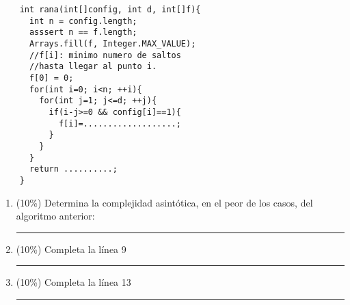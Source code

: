 \documentclass[9.5 pt]{article}
\begin{document}
\begin{multicols}{2}
\begin{itemize}[noitemsep]
	\end{itemize}
	\begin{lstlisting}
	int rana(int[]config, int d, int[]f){
	  int n = config.length;
	  asssert n == f.length;
	  Arrays.fill(f, Integer.MAX_VALUE);
	  //f[i]: minimo numero de saltos  
	  //hasta llegar al punto i.
	  f[0] = 0;
	  for(int i=0; i<n; ++i){
	    for(int j=1; j<=d; ++j){
	      if(i-j>=0 && config[i]==1){
	        f[i]=...................;
	      }
	    }
	  }
	  return ..........;
	}
	\end{lstlisting}
	\begin{enumerate}[label=\alph*]
		\item (10\%) Determina la complejidad asintótica, en el peor de los casos, del algoritmo anterior:
		\indent\rule{100pt}{0.4pt}
		\item (10\%) Completa la línea 9
		\indent\rule{100pt}{0.4pt}
		\item (10\%) Completa la línea 13
		\indent\rule {100pt}{0.4pt}
	\end{enumerate}
	


\end{multicols}
\end{document}

